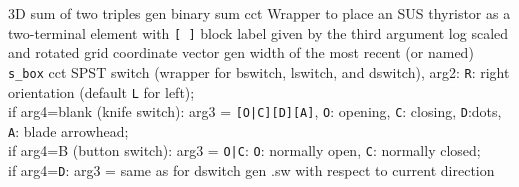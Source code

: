 %
  {3D} {sum of two triples}%
%
  {gen}%
  {binary sum}%
%
  {cct}%
  {Wrapper to place an SUS thyristor as a two-terminal element with
   {\tt [ ]} block label given by the third argument
    }%
%
  {log}%
  {scaled and rotated grid coordinate vector}%
%
  {gen}%
  {width of the most recent (or named) {\tt s\_box}%
    }%
%
  {cct}%
  {SPST switch (wrapper for bswitch, lswitch, and dswitch),
    arg2: {\tt R}: right orientation (default {\tt L} for left);\\
     if arg4=blank (knife switch): arg3 = {\tt [O|C][D][A]},
       {\tt O}: opening, {\tt C}: closing, {\tt D}:dots,
       {\tt A}: blade arrowhead;\\
     if arg4=B (button switch): arg3 = 
       {\tt O|C}: {\tt O}: normally open, {\tt C}: normally closed;\\
     if arg4={\tt D}: arg3 = same as for dswitch }%
%
  {gen}%
  {.sw with respect to current direction}%

%

